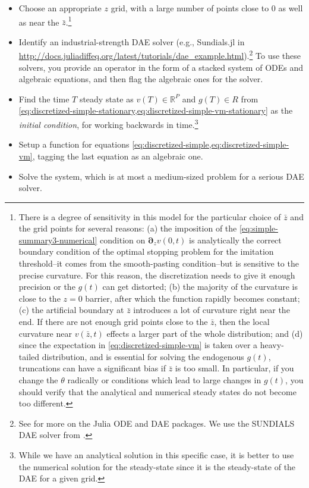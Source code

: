 \documentclass[11pt]{article}
\newcommand{\D}[1][]{\ensuremath{\boldsymbol{\partial}_{#1}}}
\newcommand{\R}{\ensuremath{\mathbb{R}}}
\begin{document}
\begin{itemize}
	\item Choose an appropriate $z$ grid, with a large number of points close to $0$ as well as near the $\bar{z}$.\footnote{There is a degree of sensitivity in this model for the particular choice of $\bar{z}$ and the grid points for several reasons: (a) the imposition of the \cref{eq:simple-summary3-numerical} condition on $\D[z]v(0,t)$  is analytically the correct boundary condition of the optimal stopping problem for the imitation threshold--it comes from the smooth-pasting condition--but is sensitive to the precise curvature.  For this reason, the discretization needs to give it enough precision or the $g(t)$ can get distorted; (b) the majority of the curvature is close to the $z=0$ barrier, after which the function rapidly becomes constant; (c) the artificial boundary at $\bar{z}$ introduces a lot of curvature right near the end.  If there are not enough grid points close to the $\bar{z}$, then the local curvature near $v(\bar{z},t)$ effects a larger part of the whole distribution; and (d) since the expectation in \cref{eq:discretized-simple-vm} is taken over a heavy-tailed distribution, and is essential for solving the endogenous $g(t)$, truncations can have a significant bias if $\bar{z}$ is too small.  In particular, if you change the $\theta$ radically or conditions which lead to large changes in $g(t)$, you should verify that the analytical and numerical steady states do not become too different.}
	\item Identify an industrial-strength DAE solver (e.g., Sundials.jl in \url{http://docs.juliadiffeq.org/latest/tutorials/dae_example.html}).\footnote{See \cite{RackauckasNie2017} for more on the Julia ODE and DAE packages.  We use the SUNDIALS DAE solver from \cite{HindmarshBrownGrantEtAl2005}.}  To use these solvers, you provide an operator in the form of a stacked system of ODEs and algebraic equations, and then flag the algebraic ones for the solver.
	\item Find the time $T$ steady state as $v(T) \in \R^P$ and $g(T) \in R$ from \cref{eq:discretized-simple-stationary,eq:discretized-simple-vm-stationary} as the \textit{initial condition}, for working backwards in time.\footnote{While we have an analytical solution in this specific case, it is better to use the numerical solution for the steady-state since it is the steady-state of the DAE for a given grid.}
	\item Setup a function for equations \cref{eq:discretized-simple,eq:discretized-simple-vm}, tagging the last equation as an algebraic one.
	\item Solve the system, which is at most a medium-sized problem for a serious DAE solver.
\end{itemize}
\end{document}
